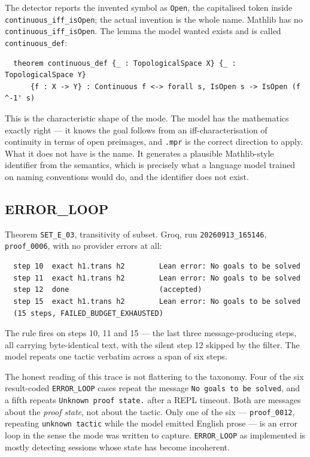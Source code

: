 The detector reports the invented symbol as \texttt{Open}, the capitalised
token inside \texttt{continuous\_iff\_isOpen}; the actual invention is the whole
name. Mathlib has no \texttt{continuous\_iff\_isOpen}. The lemma the model
wanted exists and is called \texttt{continuous\_def}:

\begin{verbatim}
  theorem continuous_def {_ : TopologicalSpace X} {_ : TopologicalSpace Y}
      {f : X -> Y} : Continuous f <-> forall s, IsOpen s -> IsOpen (f ^-1' s)
\end{verbatim}

This is the characteristic shape of the mode. The model has the mathematics
exactly right --- it knows the goal follows from an iff-characterisation of
continuity in terms of open preimages, and \texttt{.mpr} is the correct
direction to apply. What it does not have is the name. It generates a
plausible Mathlib-style identifier from the semantics, which is precisely what a
language model trained on naming conventions would do, and the identifier does
not exist.

\subsection{ERROR\_LOOP}

Theorem \texttt{SET\_E\_03}, transitivity of subset. Groq, run
\texttt{20260913\_165146}, \texttt{proof\_0006}, with no provider errors at all:

\begin{verbatim}
  step 10  exact h1.trans h2        Lean error: No goals to be solved
  step 11  exact h1.trans h2        Lean error: No goals to be solved
  step 12  done                     (accepted)
  step 15  exact h1.trans h2        Lean error: No goals to be solved
  (15 steps, FAILED_BUDGET_EXHAUSTED)
\end{verbatim}

The rule fires on steps 10, 11 and 15 --- the last three message-producing
steps, all carrying byte-identical text, with the silent step 12 skipped by the
filter. The model repeats one tactic verbatim across a span of six steps.

The honest reading of this trace is not flattering to the taxonomy. Four of the
six result-coded \texttt{ERROR\_LOOP} cases repeat the message
\texttt{No goals to be solved}, and a fifth repeats \texttt{Unknown proof
state.} after a REPL timeout. Both are messages about the \emph{proof state},
not about the tactic. Only one of the six --- \texttt{proof\_0012}, repeating
\texttt{unknown tactic} while the model emitted English prose --- is an error
loop in the sense the mode was written to capture. \texttt{ERROR\_LOOP} as
implemented is mostly detecting sessions whose state has become incoherent.


